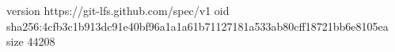 version https://git-lfs.github.com/spec/v1
oid sha256:4cfb3c1b913dc91e40bf96a1a1a61b71127181a533ab80cff18721bb6e8105ea
size 44208
